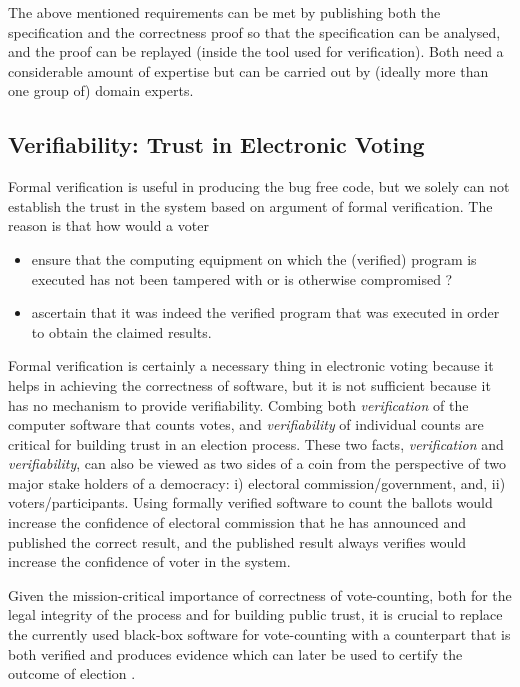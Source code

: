 	\noindent
	The above mentioned requirements can be met by publishing both the
	specification and the correctness proof so that the specification
	can be analysed, and the proof can be replayed (inside the tool used for 
	verification). Both need a
	considerable amount of expertise but can be carried out by (ideally
	more than one group of) domain experts.
	

	
	  
	 
		
 \subsection{Verifiability: Trust in Electronic Voting}
  Formal verification is useful in producing the 
   bug free code, but we solely can not 
   establish the trust in the system based on argument of 
   formal verification. The reason is that how would a voter
   \begin{itemize}
   \item ensure that the computing equipment on which the (verified)
	program is executed has not been tampered with or is otherwise
	compromised ?
	\item ascertain that it was indeed the verified program that was
	executed in order to obtain the claimed results.
   \end{itemize}
   
   \noindent
   Formal verification is certainly a necessary thing in electronic voting because 
   it helps in achieving the correctness of software, but it is not sufficient because
   it has no mechanism to provide  verifiability.
   Combing both \emph{verification} of the
	computer software that counts votes, and
	\emph{verifiability} of individual counts are critical for
	building trust in an election process. These two facts, 
	 \emph{verification}  and \emph{verifiability}, 
	 can also be viewed as 
    two sides of a coin from the perspective of two major stake holders of 
    a democracy: i) electoral commission/government, and, ii) voters/participants.  
    Using formally 
    verified software to count the ballots would increase the confidence 
    of electoral commission that he has announced and published the correct result, and 
    the published result always verifies would increase the confidence
    of voter in the system. 
	 
	 
	Given the mission-critical importance of
	 correctness of vote-counting,
	both for the legal integrity of the process and for
	building public trust,  it is crucial to replace the
	currently used black-box software for vote-counting with a
	counterpart that is both verified and produces 
	evidence which can later be used to certify
	the outcome of election \citep{Bernhard:2017:PES} \citep{Rivest:2008:PTRS}.
	
